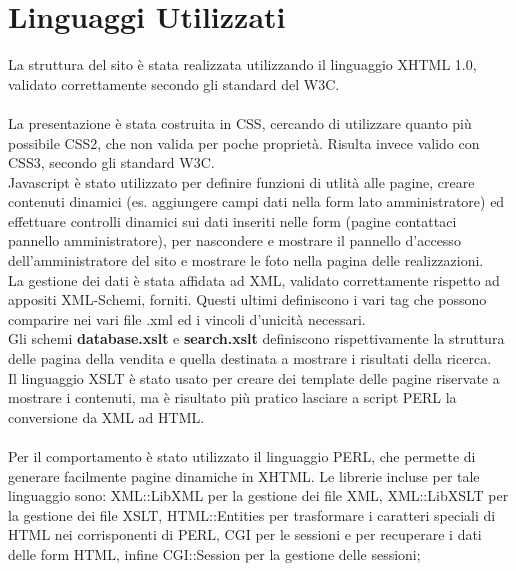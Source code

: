 \section{Linguaggi Utilizzati}{
	La struttura del sito è stata realizzata utilizzando il linguaggio XHTML 1.0, validato correttamente secondo gli standard del W3C. \\
	\\
	La presentazione è stata costruita in CSS, cercando di utilizzare quanto più possibile CSS2, che non valida per poche proprietà. Risulta invece valido con CSS3, secondo gli standard W3C.
	\\
	Javascript è stato utilizzato per definire funzioni di utlità alle pagine, creare contenuti dinamici (es. aggiungere campi dati nella form lato amministratore) ed effettuare controlli dinamici sui dati inseriti nelle form (pagine contattaci pannello amministratore), per nascondere e mostrare il pannello d'accesso dell'amministratore del sito e mostrare le foto nella pagina delle realizzazioni.
	\\
	La gestione dei dati è stata affidata ad XML, validato correttamente rispetto ad appositi XML-Schemi, forniti. Questi ultimi definiscono i vari tag che possono comparire nei vari file .xml ed i vincoli d'unicità necessari.\\
	Gli schemi \textbf{database.xslt} e \textbf{search.xslt} definiscono rispettivamente la struttura delle pagina della vendita e quella destinata a mostrare i risultati della ricerca.
	\\
	Il linguaggio XSLT è stato usato per creare dei template delle pagine riservate a mostrare i contenuti, ma è risultato più pratico lasciare a script PERL la conversione da XML ad HTML.\\
	\\
	Per il comportamento è stato utilizzato il linguaggio PERL, che permette di generare facilmente pagine dinamiche in XHTML. Le librerie incluse per tale linguaggio sono: XML::LibXML per la gestione dei file XML, XML::LibXSLT per la gestione dei file XSLT, HTML::Entities per trasformare i caratteri speciali di HTML nei corrisponenti di PERL, CGI per le sessioni e per recuperare i dati delle form HTML, infine CGI::Session per la gestione delle sessioni;
}
